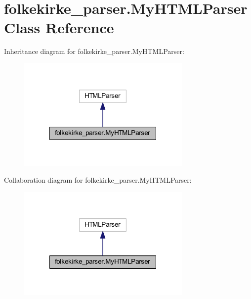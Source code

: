 \hypertarget{classfolkekirke__parser_1_1_my_h_t_m_l_parser}{\section{folkekirke\-\_\-parser.\-My\-H\-T\-M\-L\-Parser Class Reference}
\label{classfolkekirke__parser_1_1_my_h_t_m_l_parser}
}


Inheritance diagram for folkekirke\-\_\-parser.\-My\-H\-T\-M\-L\-Parser\-:\nopagebreak
\begin{figure}[H]
\begin{center}
\leavevmode
\includegraphics[width=240pt]{classfolkekirke__parser_1_1_my_h_t_m_l_parser__inherit__graph}
\end{center}
\end{figure}


Collaboration diagram for folkekirke\-\_\-parser.\-My\-H\-T\-M\-L\-Parser\-:\nopagebreak
\begin{figure}[H]
\begin{center}
\leavevmode
\includegraphics[width=240pt]{classfolkekirke__parser_1_1_my_h_t_m_l_parser__coll__graph}
\end{center}
\end{figure}
